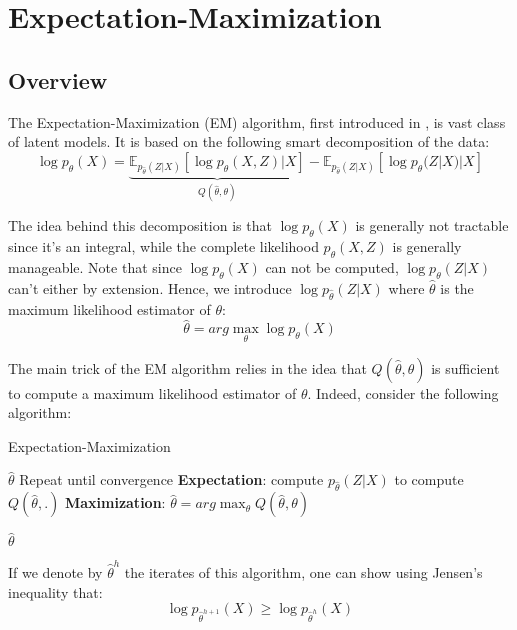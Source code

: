 \section{Expectation-Maximization} \label{section:EM}

\subsection{Overview}

The Expectation-Maximization (EM) algorithm, first introduced in \cite{expectation_maximization_source}, is vast class of latent models.
It is based on the following smart decomposition of the data:
$$
\log p_{\theta}(X) = \underbrace{\mathbb{E}_{p_{\widehat{\theta}}(Z|X)}[\log p_{\theta}(X,Z)|X]}_{Q(\widehat{\theta}, \theta)} - \mathbb{E}_{p_{\widehat{\theta}}(Z|X)}[\log p_{\theta}(Z|X)|X]
$$

The idea behind this decomposition is that $\log p_{\theta}(X)$ is generally not tractable since it's an integral, while the complete likelihood $p_{\theta}(X,Z)$ is generally manageable.
Note that since $\log p_{\theta}(X)$ can not be computed, $\log p_{\theta}(Z|X)$ can't either by extension.
Hence, we introduce $\log p_{\widehat{\theta}}(Z|X)$ where $\widehat{\theta}$ is the maximum likelihood estimator of $\theta$:
$$
\widehat{\theta} = arg\max_{\theta} \log p_{\theta}(X)
$$

The main trick of the EM algorithm relies in the idea that $Q(\widehat{\theta}, \theta)$ is sufficient to compute a maximum likelihood estimator of $\theta$.
Indeed, consider the following algorithm:
\begin{algorithm}[H]
    \caption{Expectation-Maximization}
    \begin{algorithmic}
        \REQUIRE $\widehat{\theta}$
        \STATE Repeat until convergence
            \STATE \quad \textbf{Expectation}: compute $p_{\widehat{\theta}}(Z|X)$ to compute $Q(\widehat{\theta}, .)$
            \STATE \quad \textbf{Maximization}: $\widehat{\theta} = arg\max_{\theta} Q(\widehat{\theta}, \theta)$

        \RETURN{} $\widehat{\theta}$
    \end{algorithmic}

    \label{alg:em_algo}
\end{algorithm}

If we denote by $\widehat{\theta}^h$ the iterates of this algorithm, one can show using Jensen's inequality that:
$$
\log p_{\widehat{\theta}^{h+1}}(X) \geq \log p_{\widehat{\theta}^h}(X)
$$

